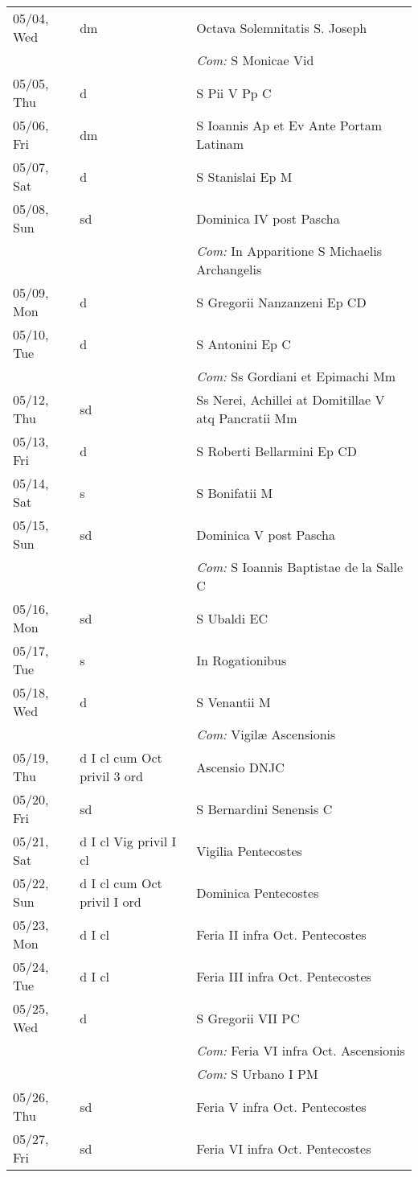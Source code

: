 \documentclass[10pt]{article}
\begin{document}
\begin{longtable}{ l l l }
05/04, Wed & dm & Octava Solemnitatis S. Joseph\\
 & & \textit{Com:} S Monicae Vid\\
05/05, Thu & d & S Pii V Pp C\\
05/06, Fri & dm & S Ioannis Ap et Ev Ante Portam Latinam\\
05/07, Sat & d & S Stanislai Ep M\\
05/08, Sun & sd & Dominica IV post Pascha\\
 & & \textit{Com:} In Apparitione S Michaelis Archangelis\\
05/09, Mon & d & S Gregorii Nanzanzeni Ep CD\\
05/10, Tue & d & S Antonini Ep C\\
 & & \textit{Com:} Ss Gordiani et Epimachi Mm\\
05/12, Thu & sd & Ss Nerei, Achillei at Domitillae V atq Pancratii Mm\\
05/13, Fri & d & S Roberti Bellarmini Ep CD\\
05/14, Sat & s & S Bonifatii M\\
05/15, Sun & sd & Dominica V post Pascha\\
 & & \textit{Com:} S Ioannis Baptistae de la Salle C\\
05/16, Mon & sd & S Ubaldi EC\\
05/17, Tue & s & In Rogationibus\\
05/18, Wed & d & S Venantii M\\
 & & \textit{Com:} Vigilæ Ascensionis\\
05/19, Thu & d I cl cum Oct privil 3 ord & Ascensio DNJC\\
05/20, Fri & sd & S Bernardini Senensis C\\
05/21, Sat & d I cl Vig privil I cl & Vigilia Pentecostes\\
05/22, Sun & d I cl cum Oct privil I ord & Dominica Pentecostes\\
05/23, Mon & d I cl & Feria II infra Oct. Pentecostes\\
05/24, Tue & d I cl & Feria III infra Oct. Pentecostes\\
05/25, Wed & d & S Gregorii VII PC\\
 & & \textit{Com:} Feria VI infra Oct. Ascensionis\\
 & & \textit{Com:} S Urbano I PM\\
05/26, Thu & sd & Feria V infra Oct. Pentecostes\\
05/27, Fri & sd & Feria VI infra Oct. Pentecostes\\

\end{longtable}
\end{document}
